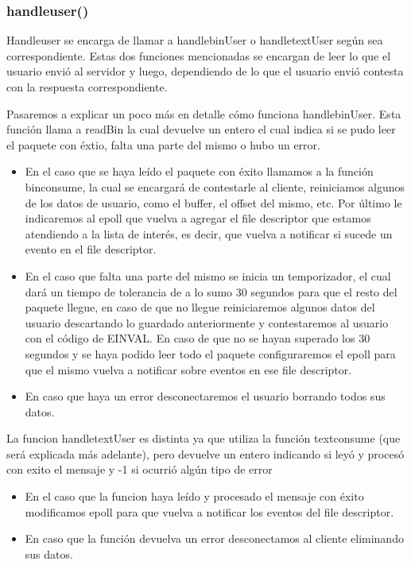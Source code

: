 \documentclass{article}
\begin{document}
\subsubsection{handle\textunderscore user()}
Handle\textunderscore user se encarga de llamar a
handle\textunderscore binUser o 
handle\textunderscore textUser según sea correspondiente.
Estas dos funciones mencionadas se encargan de leer
lo que el usuario envió al servidor y luego, dependiendo
de lo que el usuario envió contesta con la respuesta
correspondiente.

Pasaremos a explicar un poco más en detalle cómo funciona
handle\textunderscore binUser. Esta función llama a readBin
la cual devuelve un entero el cual indica si se pudo leer
el paquete con éxtio, falta una parte del mismo o hubo un
error. 
\begin{itemize}
\item En el caso que se haya leído el paquete con éxito
llamamos a la función bin\textunderscore consume, la cual se 
encargará de contestarle al cliente, reiniciamos algunos
de los datos de usuario, como el buffer, el offset del mismo, etc.
Por último le indicaremos al epoll que vuelva a agregar el file descriptor
que estamos atendiendo a la lista de interés, es decir, que
vuelva a notificar si sucede un evento en el file descriptor.
\item En el caso que falta una parte del mismo se inicia
un temporizador, el cual dará un tiempo de tolerancia
de a lo sumo 30 segundos para que el resto del paquete llegue,
en caso de que no llegue reiniciaremos algunos datos del usuario
descartando lo guardado anteriormente y contestaremos al usuario
con el código de EINVAL. En caso de que no se hayan superado
los 30 segundos  y se haya podido leer todo el paquete 
configuraremos el epoll para que el mismo vuelva
a notificar sobre eventos en ese file descriptor.
\item En caso que haya un error desconectaremos el usuario
borrando todos sus datos.
\end{itemize}

La funcion handle\textunderscore textUser es distinta ya 
que utiliza la función text\textunderscore consume (que será
explicada más adelante), pero devuelve un entero indicando
si leyó y procesó con exito el mensaje y -1 si ocurrió algún
tipo de error
\begin{itemize}
\item En el caso que la funcion haya leído y procesado
el mensaje con éxito modificamos epoll para que vuelva a
notificar los eventos del file descriptor.
\item En caso que la función devuelva un error desconectamos
al cliente eliminando sus datos.
\end{itemize}
\end{document}
